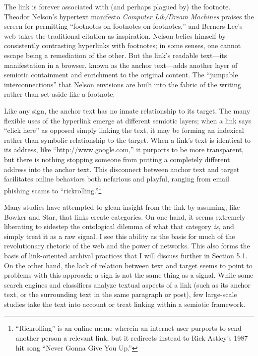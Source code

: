 The link is forever associated with (and perhaps plagued by) the footnote. Theodor Nelson's hypertext manifesto \emph{Computer Lib/Dream Machines} praises the screen for permitting ``footnotes on footnotes on footnotes,''\autocite[DM19]{nelson_computer_1974} and Berners-Lee's web takes the traditional citation as inspiration. Nelson belies himself by consistently contrasting hyperlinks with footnotes; in some senses, one cannot escape being a remediation of the other. But the link's readable text---its manifestation in a browser, known as the anchor text---adds another layer of semiotic containment and enrichment to the original content. The ``jumpable interconnections'' that Nelson envisions are built into the fabric of the writing rather than set aside like a footnote.

Like any sign, the anchor text has no innate relationship to its target. The many flexible uses of the hyperlink emerge at different semiotic layers; when a link says ``click here'' as opposed simply linking the text, it may be forming an indexical rather than symbolic relationship to the target. When a link's text is identical to its address, like ``http://www.google.com,'' it purports to be more transparent, but there is nothing stopping someone from putting a completely different address into the anchor text. This disconnect between anchor text and target facilitates online behaviors both nefarious and playful, ranging from email phishing scams to ``rickrolling.''\footnote{``Rickrolling'' is an online meme wherein an internet user purports to send another person a relevant link, but it redirects instead to Rick Astley's 1987 hit song ``Never Gonna Give You Up.''}

Many studies have attempted to glean insight from the link by assuming, like Bowker and Star, that links create categories. On one hand, it seems extremely liberating to sidestep the ontological dilemma of what that category \emph{is}, and simply treat it as a raw signal. I see this ability as the basis for much of the revolutionary rhetoric of the web and the power of networks. This also forms the basis of link-oriented archival practices that I will discuss further in Section 5.1. %
On the other hand, the lack of relation between text and target seems to point to problems with this approach: a sign is not the same thing as a signal. While some search engines and classifiers analyze textual aspects of a link (such as its anchor text, or the surrounding text in the same paragraph or post), few large-scale studies take the text into account or treat linking within a semiotic framework.

